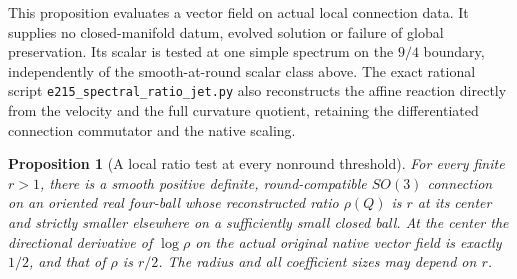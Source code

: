 \documentclass[11pt]{article}
\numberwithin{equation}{section}
\newtheorem{proposition}[theorem]{Proposition}
\theoremstyle{definition}
\theoremstyle{remark}
\begin{document}
This proposition evaluates a vector field on actual local
connection data. It supplies no closed-manifold datum,
evolved solution or failure of global preservation.
Its scalar is tested at one simple spectrum on the \(9/4\)
boundary, independently of the smooth-at-round scalar class
above. The exact rational script
\texttt{e215\_spectral\_ratio\_jet.py} also reconstructs the
affine reaction directly from the velocity and the full
curvature quotient, retaining the differentiated connection
commutator and the native scaling.


\begin{proposition}[A local ratio test at every nonround threshold]
\label{prop:all-ratio-local-maximum}
For every finite $r>1$, there is a smooth positive definite,
round-compatible $SO(3)$ connection on an oriented real
four-ball whose reconstructed ratio $\rho(Q)$ is $r$ at its
center and strictly smaller elsewhere on a sufficiently small
closed ball. At the center the directional derivative of
$\log\rho$ on the actual original native vector field is
exactly $1/2$, and that of $\rho$ is $r/2$.
The radius and all coefficient sizes may depend on $r$.
\end{proposition}
\end{document}

